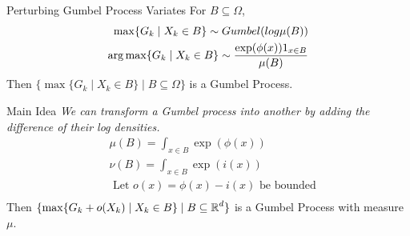 

\begin{frame}{Perturbing Gumbel Process Variates}
  For $B \subseteq \Omega$,
  \begin{align*}
    \max \{G_k \mid X_k \in B\} \sim Gumbel(log \mu(B)) \\
    \operatorname*{{arg\,max}} \{G_k \mid X_k \in B\} \sim \frac{\exp(\phi(x))1_{x \in B}}{\mu(B)} \\
  \end{align*}
  Then $\{ \max \{G_k \mid X_k \in B\} \mid B \subseteq \Omega\}$ is a Gumbel Process.
\end{frame}



\begin{frame}{Main Idea}
  \emph{We can transform a Gumbel process into another by adding the difference of their log densities.} \\
  \begin{align*}
    & \mu(B) = \int_{x\in B} \exp(\phi(x)) \\
    & \nu(B)=\int_{x\in B} \exp(i(x)) \tag{easy}\\
    & \text{ Let $o(x) = \phi(x) - i(x)$ be bounded} \\
  \end{align*}
  Then $\{\max\{G_k + o(X_k) \mid X_k \in B\} \mid B \subseteq \operatorname{\mathbb{R}}^d\}$ is a Gumbel Process with measure $\mu$.
  
\end{frame}

